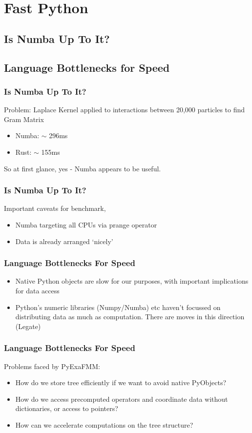 \section{Fast Python}
\subsection{Is Numba Up To It?}
\subsection{Language Bottlenecks for Speed}

\begin{frame}
\frametitle{Is Numba Up To It?}

Problem: Laplace Kernel applied to interactions between 20,000 particles to find Gram Matrix
\begin{itemize}
    \item Numba: $\sim$ 296ms
    \item Rust: $\sim$ 155ms
\end{itemize}

So at first glance, yes - Numba appears to be useful.
\end{frame}

\begin{frame}
\frametitle{Is Numba Up To It?}
    Important caveats for benchmark,
    \begin{itemize}
        \item Numba targeting all CPUs via prange operator
        \item Data is already arranged `nicely'
    \end{itemize}
\end{frame}

\begin{frame}
    \frametitle{Language Bottlenecks For Speed}
    \begin{itemize}
        \item Native Python objects are slow for our purposes, with important implications for data access
        \item Python's numeric libraries (Numpy/Numba) etc haven't focussed on distributing data as much as computation. There are moves in this direction (Legate)
    \end{itemize}
\end{frame}


\begin{frame}
    \frametitle{Language Bottlenecks For Speed}
    Problems faced by PyExaFMM:
    \begin{itemize}
        \item How do we store tree efficiently if we want to avoid native PyObjects?
        \item How do we access precomputed operators and coordinate data without dictionaries, or access to pointers?
        \item How can we accelerate computations on the tree structure?
    \end{itemize}
\end{frame}